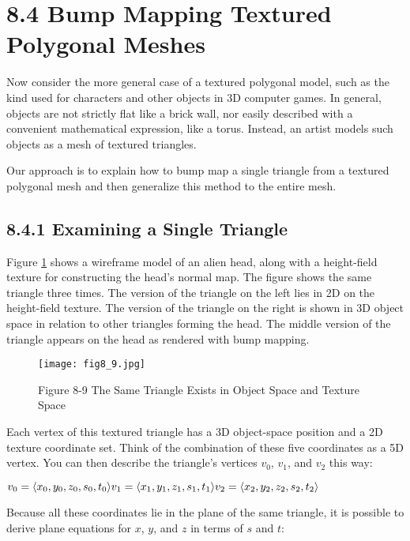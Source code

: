 \documentclass[../main.tex]{subfiles}
\begin{document}
\section{8.4 Bump Mapping Textured Polygonal Meshes}

Now consider the more general case of a textured polygonal model, such as the kind used for characters and other objects in 3D computer games. In general, objects are not strictly flat like a brick wall, nor easily described with a convenient mathematical expression, like a torus. Instead, an artist models such objects as a mesh of textured triangles.

Our approach is to explain how to bump map a single triangle from a textured polygonal mesh and then generalize this method to the entire mesh.

\subsection{8.4.1 Examining a Single Triangle}

Figure \ref{fig:8-9} shows a wireframe model of an alien head, along with a height-field texture for constructing the head's normal map. The figure shows the same triangle three times. The version of the triangle on the left lies in 2D on the height-field texture. The version of the triangle on the right is shown in 3D object space in relation to other triangles forming the head. The middle version of the triangle appears on the head as rendered with bump mapping.

\begin{figure}
    \centering
    \texttt{[image: fig8\_9.jpg]}
    \caption{Figure 8-9 The Same Triangle Exists in Object Space and Texture Space}
    \label{fig:8-9}
\end{figure}

Each vertex of this textured triangle has a 3D object-space position and a 2D texture coordinate set. Think of the combination of these five coordinates as a 5D vertex. You can then describe the triangle's vertices $v_0$, $v_1$, and $v_2$ this way:

\FloatBarrier
$
v_0=\langle x_0,y_0,z_0,s_0,t_0\rangle \newline
v_1=\langle x_1,y_1,z_1,s_1,t_1\rangle \newline
v_2=\langle x_2,y_2,z_2,s_2,t_2\rangle \newline
$
\FloatBarrier

Because all these coordinates lie in the plane of the same triangle, it is possible to derive plane equations for $x$, $y$, and $z$ in terms of $s$ and $t$:
\end{document}
